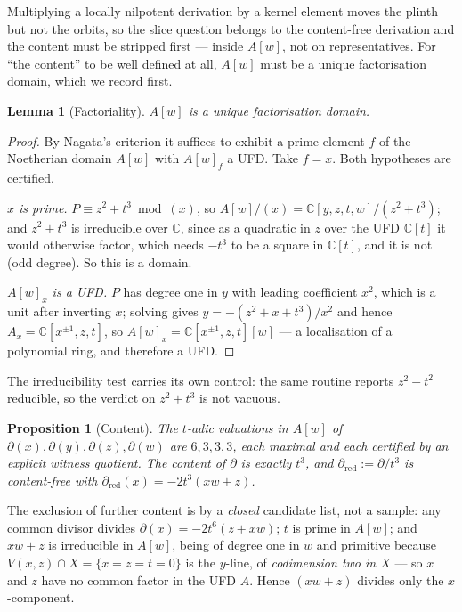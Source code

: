 \documentclass[11pt]{article}
\newtheorem{lemma}[theorem]{Lemma}
\newtheorem{proposition}[theorem]{Proposition}
\theoremstyle{definition}
\theoremstyle{remark}
\newcommand{\C}{\mathbb{C}}
\begin{document}
Multiplying a locally nilpotent derivation by a kernel element moves the
plinth but not the orbits, so the slice question belongs to the content-free
derivation and the content must be stripped first --- inside $A[w]$, not on
representatives. For ``the content'' to be well defined at all, $A[w]$ must be
a unique factorisation domain, which we record first.

\begin{lemma}[Factoriality]\label{lem:ufd}
$A[w]$ is a unique factorisation domain.
\end{lemma}

\begin{proof}
By Nagata's criterion it suffices to exhibit a prime element $f$ of the
Noetherian domain $A[w]$ with $A[w]_f$ a UFD. Take $f=x$. Both hypotheses are
certified.

\emph{$x$ is prime.} $P\equiv z^2+t^3 \bmod (x)$, so
$A[w]/(x)=\C[y,z,t,w]/(z^2+t^3)$; and $z^2+t^3$ is irreducible over $\C$,
since as a quadratic in $z$ over the UFD $\C[t]$ it would otherwise factor,
which needs $-t^3$ to be a square in $\C[t]$, and it is not (odd degree). So
this is a domain.

\emph{$A[w]_x$ is a UFD.} $P$ has degree one in $y$ with leading coefficient
$x^2$, which is a unit after inverting $x$; solving gives
$y=-(z^2+x+t^3)/x^2$ and hence $A_x=\C[x^{\pm1},z,t]$, so
$A[w]_x=\C[x^{\pm1},z,t][w]$ --- a localisation of a polynomial ring, and
therefore a UFD.
\end{proof}

The irreducibility test carries its own control: the same routine reports
$z^2-t^2$ reducible, so the verdict on $z^2+t^3$ is not vacuous.

\begin{proposition}[Content]\label{prop:content}
The $t$-adic valuations in $A[w]$ of $\partial(x),\partial(y),\partial(z),
\partial(w)$ are $6,3,3,3$, each maximal and each certified by an explicit
witness quotient. The content of $\partial$ is exactly $t^3$, and
$\partial_{\mathrm{red}}:=\partial/t^3$ is content-free with
$\partial_{\mathrm{red}}(x)=-2t^3(xw+z)$.
\end{proposition}

The exclusion of further content is by a \emph{closed} candidate list, not a
sample: any common divisor divides $\partial(x)=-2t^6(z+xw)$; $t$ is prime in
$A[w]$; and $xw+z$ is irreducible in $A[w]$, being of degree one in $w$ and
primitive because $V(x,z)\cap X=\{x=z=t=0\}$ is the $y$-line, of
\emph{codimension two in $X$} --- so $x$ and $z$ have no common factor in the
UFD $A$. Hence $(xw+z)$ divides only the $x$-component.
\end{document}
